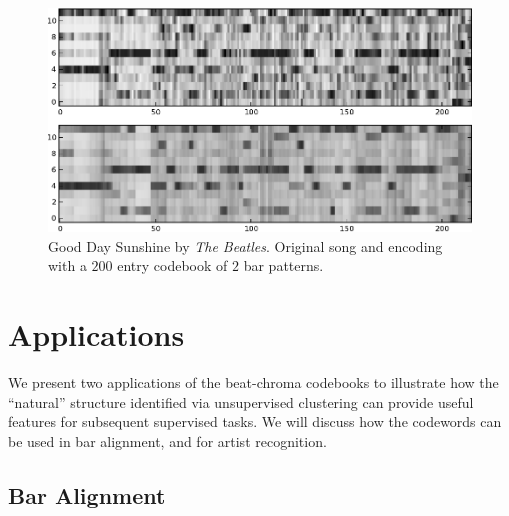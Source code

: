 \documentclass{article}
\begin{document}
\begin{figure}[htb]
\begin{center}
\includegraphics[width=.9\columnwidth]{song_encoded}
\end{center}
\caption{\small{Good Day Sunshine by \textit{The Beatles}.
Original song and encoding with a $200$ entry codebook of 
$2$ bar patterns.
}}
\label{fig:encodesong}
\end{figure}


\section{Applications}\label{sec:exps2}
We present two applications of the beat-chroma codebooks
to illustrate how the ``natural'' structure identified via 
unsupervised clustering can provide useful 
features for subsequent supervised tasks.  We will discuss how 
the codewords can be used in bar alignment, and for artist
recognition.  
%

\subsection{Bar Alignment} \label{ssec:segment}
\end{document}
